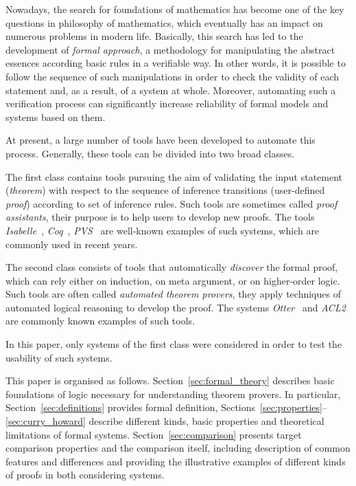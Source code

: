 \documentclass[article]{aaltoseries}
\begin{document}
Nowadays, the search for foundations of mathematics has become one of the key questions in philosophy of mathematics, which eventually has an impact on numerous problems in modern life. Basically, this search has led to the development of \textit{formal approach}, a methodology for manipulating the abstract essences according basic rules in a verifiable way. In other words, it is possible to follow the sequence of such manipulations in order to check the validity of each statement and, as a result, of a system at whole. Moreover, automating such a verification process can significantly increase reliability of formal models and systems based on them.

At present, a large number of tools have been developed to automate this process. Generally, these tools can be divided into two broad classes. 

The first class contains tools pursuing the aim of validating the input statement (\textit{theorem}) with respect to the sequence of inference transitions (user-defined \textit{proof}) according to set of inference rules. Such tools are sometimes called \textit{proof assistants}, their purpose is to help users to develop new proofs. The tools \textit{Isabelle}~\cite{tool_Isabelle}, \textit{Coq}~\cite{tool_Coq}, \textit{PVS}~\cite{tool_Pvs} are well-known examples of such systems, which are commonly used in recent years.

The second class consists of tools that automatically \textit{discover} the formal proof, which can rely either on induction, on meta argument, or on higher-order logic. Such tools are often called \textit{automated theorem provers}, they apply techniques of automated logical reasoning to develop the proof. The systems \textit{Otter}~\cite{tool_Otter} and \textit{ACL2}~\cite{tool_Acl} are commonly known examples of such tools. 

In this paper, only systems of the first class were considered in order to test the usability of such systems.

This paper is organised as follows. Section~\ref{sec:formal_theory} describes basic foundations of logic necessary for understanding theorem provers. In particular, Section~\ref{sec:definitions} provides formal definition, Sections~\ref{sec:properties}--\ref{sec:curry_howard} describe different kinds, basic properties and theoretical limitations of formal systems.
Section~\ref{sec:comparison} presents target comparison properties and the comparison itself, including description of common features and differences and providing the illustrative examples of different kinds of proofs in both considering systems.
\end{document}
